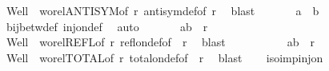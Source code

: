 \begin{isabellebody}
\ Well\ {\isacharasterisk}{\kern0pt}{\isacharasterisk}{\kern0pt}{\isacharasterisk}{\kern0pt}\ wo{\isacharunderscore}{\kern0pt}rel{\isachardot}{\kern0pt}ANTISYM{\isacharbrackleft}{\kern0pt}of\ r{\isacharprime}{\kern0pt}{\isacharbrackright}{\kern0pt}\ antisym{\isacharunderscore}{\kern0pt}def{\isacharbrackleft}{\kern0pt}of\ r{\isacharprime}{\kern0pt}{\isacharbrackright}{\kern0pt}\ \isamarkupfalse%
\ blast\isanewline
\ \ \ \ \ \isamarkupfalse%
\ {\isachardoublequoteopen}a\ {\isacharequal}{\kern0pt}\ b{\isachardoublequoteclose}\ \isamarkupfalse%
\ {\isacharasterisk}{\kern0pt}\ {\isacharasterisk}{\kern0pt}{\isacharasterisk}{\kern0pt}\ \isamarkupfalse%
\ bij{\isacharunderscore}{\kern0pt}betw{\isacharunderscore}{\kern0pt}def\ inj{\isacharunderscore}{\kern0pt}on{\isacharunderscore}{\kern0pt}def\ \isamarkupfalse%
\ auto\isanewline
\ \ \ \ \ \isamarkupfalse%
\ {\isachardoublequoteopen}{\isacharparenleft}{\kern0pt}a{\isacharcomma}{\kern0pt}b{\isacharparenright}{\kern0pt}\ {\isasymin}\ r{\isachardoublequoteclose}\ \isamarkupfalse%
\ Well\ {\isacharasterisk}{\kern0pt}{\isacharasterisk}{\kern0pt}\ wo{\isacharunderscore}{\kern0pt}rel{\isachardot}{\kern0pt}REFL{\isacharbrackleft}{\kern0pt}of\ r{\isacharbrackright}{\kern0pt}\ refl{\isacharunderscore}{\kern0pt}on{\isacharunderscore}{\kern0pt}def{\isacharbrackleft}{\kern0pt}of\ {\isacharunderscore}{\kern0pt}\ r{\isacharbrackright}{\kern0pt}\ \isamarkupfalse%
\ blast\isanewline
\ \ \ \ \isacommand{{\isacharbraceright}{\kern0pt}}\isamarkupfalse%
\isanewline
\ \ \ \ \isamarkupfalse%
\ {\isachardoublequoteopen}{\isacharparenleft}{\kern0pt}a{\isacharcomma}{\kern0pt}b{\isacharparenright}{\kern0pt}\ {\isasymin}\ r{\isachardoublequoteclose}\isanewline
\ \ \ \ \isamarkupfalse%
\ Well\ {\isacharasterisk}{\kern0pt}{\isacharasterisk}{\kern0pt}\ wo{\isacharunderscore}{\kern0pt}rel{\isachardot}{\kern0pt}TOTAL{\isacharbrackleft}{\kern0pt}of\ r{\isacharbrackright}{\kern0pt}\ total{\isacharunderscore}{\kern0pt}on{\isacharunderscore}{\kern0pt}def{\isacharbrackleft}{\kern0pt}of\ {\isacharunderscore}{\kern0pt}\ r{\isacharbrackright}{\kern0pt}\ \isamarkupfalse%
\ blast\isanewline
\ \ \isamarkupfalse%
\isanewline
{}\isamarkupfalse%
%
\endisatagproof
{\isafoldproof}%
%
\isadelimproof
\isanewline
%
\endisadelimproof
\isanewline
{}\isamarkupfalse%
\ iso{\isacharunderscore}{\kern0pt}imp{\isacharunderscore}{\kern0pt}inj{\isacharunderscore}{\kern0pt}on{\isacharcolon}{\kern0pt}\isanewline

\end{isabellebody}
